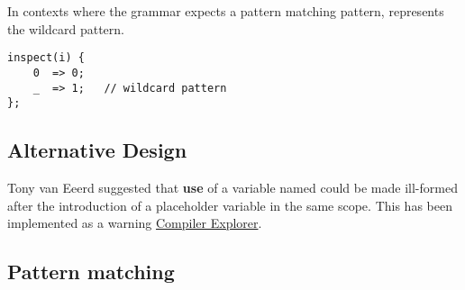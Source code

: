 \documentclass{wg21}
\begin{document}
In contexts where the grammar expects a pattern matching pattern, \tcode{_} represents the wildcard pattern.

\begin{lstlisting}[style=color]
inspect(i) {   
    0  => 0;
    _  => 1;   // wildcard pattern
};
\end{lstlisting}

\subsection{Alternative Design}

Tony van Eeerd suggested that \textbf{use} of a variable named \tcode{_} could be made ill-formed after the introduction
of a placeholder variable in the same scope.
This has been implemented as a warning \href{https://godbolt.org/z/JcD76y}{Compiler Explorer}.

\subsection{Pattern matching}
\end{document}
